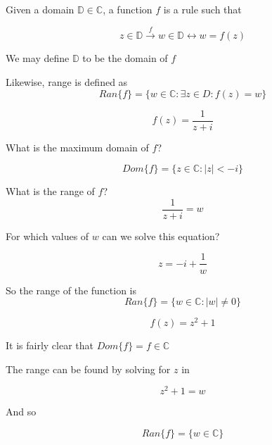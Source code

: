 \documentclass[../notes.tex]{subfiles}
\begin{document}
\begin{definition}
	Given a domain $ \mathbb{D} \in \mathbb{C} $, a function $ f $  is a rule such that

	\begin{equation}
		z \in \mathbb{D} \xrightarrow{f} w \in \mathbb{D} \leftrightarrow w = f(z)
	\end{equation}
\end{definition}


\begin{definition}
		We may define $ \mathbb{D} $ to be the domain of $ f $ 


		Likewise, range is defined as
			\begin{equation}
				Ran\{f\} = \{ w \in \mathbb{C} : \exists z \in D : f(z) = w \}
			\end{equation}
			
\end{definition}

\begin{example}
	\begin{equation}
		f(z) = \frac{1}{z+i}
	\end{equation}

	What is the maximum domain of $ f $?

	\begin{equation}
		Dom\{f\} = \{ z \in \mathbb{C} : |z| < -i \}
	\end{equation}

	What is the range of $ f $?
	\begin{equation}
		\frac{1}{z+i} = w
	\end{equation}

	For which values of $ w $ can we solve this equation?

	\begin{equation}
		z = -i + \frac{1}{w}
	\end{equation}

	So the range of the function is 
	\begin{equation}
		Ran\{f\} = \{ w \in \mathbb{C} : |w| \neq 0 \}
	\end{equation}
	
	
\end{example}


\begin{example}
	\begin{equation}
		f(z) = z^2 + 1
	\end{equation}

	It is fairly clear that $ Dom\{f\} = {f \in \mathbb{C}} $ 

	The range can be found by solving for $ z $ in

	\begin{equation}
		z^2 + 1 = w
	\end{equation}

	And so 


	\begin{equation}
		Ran\{f\} = \{ w \in \mathbb{C}\}
	\end{equation}
	
	
	
	
\end{example}
\end{document}
